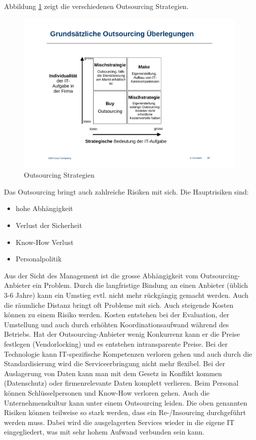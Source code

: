 Abbildung \ref{fig:outsourcing-strategie} zeigt die verschiedenen Outsourcing Strategien.
\begin{figure}
\centering
\includegraphics[width=0.7\linewidth]{fig/outsourcing-strategie}
\caption{Outsourcing Strategien}
\label{fig:outsourcing-strategie}
\end{figure}
Das Outsourcing bringt auch zahlreiche Risiken mit sich. Die Hauptrisiken sind:
\begin{itemize}
	\item hohe Abhängigkeit
	\item Verlust der Sicherheit
	\item Know-How Verlust
	\item Personalpolitik
\end{itemize}
Aus der Sicht des Management ist die grosse Abhängigkeit vom Outsourcing-Anbieter ein Problem. Durch die langfristige Bindung an einen Anbieter (üblich 3-6 Jahre) kann ein Umstieg evtl. nicht mehr rückgängig gemacht werden. Auch die räumliche Distanz bringt oft Probleme mit sich. 
Auch steigende Kosten können zu einem Risiko werden. Kosten entstehen bei der Evaluation, der Umstellung und auch durch erhöhten Koordinationsaufwand während des Betriebs. Hat der Outsourcing-Anbieter wenig Konkurrenz kann er die Preise festlegen (Vendorlocking) und es entstehen intransparente Preise.
Bei der Technologie kann IT-spezifische Kompetenzen verloren gehen und auch durch die Standardisierung wird die Serviceerbringung nicht mehr flexibel.
Bei der Auslagerung von Daten kann man mit dem Gesetz in Konflikt kommen (Datenschutz) oder firmenrelevante Daten komplett verlieren.
Beim Personal können Schlüsselpersonen und Know-How verloren gehen. Auch die Unternehmenskultur kann unter einem Outsourcing leiden.
Die oben genannten Risiken können teilweise so stark werden, dass ein Re-/Insourcing durchgeführt werden muss. Dabei wird die ausgelagerten Services wieder in die eigene IT eingegliedert, was mit sehr hohem Aufwand verbunden sein kann.

